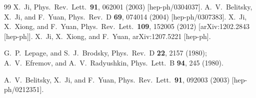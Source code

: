 \begin{thebibliography}{99}
  X.~Ji,
  Phys.\ Rev.\ Lett.\  {\bf 91}, 062001 (2003)
  [hep-ph/0304037].
  A.~V.~Belitsky, X.~Ji, and F.~Yuan,
  Phys.\ Rev.\ D {\bf 69}, 074014 (2004)
  [hep-ph/0307383].
  X.~Ji, X.~Xiong, and F.~Yuan,
  Phys.\ Rev.\ Lett.\  {\bf 109}, 152005 (2012)
  [arXiv:1202.2843 [hep-ph]].
  X.~Ji, X.~Xiong, and F.~Yuan,
  arXiv:1207.5221 [hep-ph].

  G.~P.~Lepage, and S.~J.~Brodsky,
  Phys.\ Rev.\ D {\bf 22}, 2157 (1980);
  A.~V.~Efremov, and A.~V.~Radyushkin,
  Phys.\ Lett.\ B {\bf 94}, 245 (1980).

  A.~V.~Belitsky, X.~Ji, and F.~Yuan,
  Phys.\ Rev.\ Lett.\  {\bf 91}, 092003 (2003)
  [hep-ph/0212351].


\end{thebibliography}
